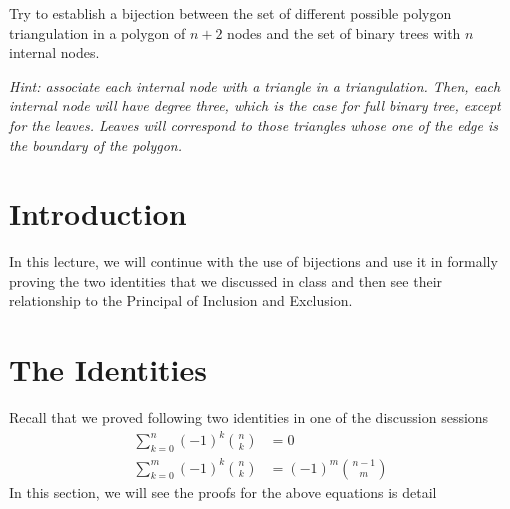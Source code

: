 
\begin{ex}
\item Try to establish a bijection between the set of different possible polygon triangulation in a polygon of $n+2$ nodes and the set of binary trees with $n$ internal nodes.

\textit{Hint: associate each internal node with a triangle in a triangulation. Then, each internal node will have degree three, which is the case for full binary tree, except for the leaves. Leaves will correspond to those triangles whose one of the edge is the boundary of the polygon.}
\end{ex}

 


\section{Introduction}
In this lecture, we will continue with the use of bijections and use it in formally proving the two identities that we discussed in class and then see their relationship to the Principal of Inclusion and Exclusion. 

\section{The Identities}
Recall that we proved following two identities in one of the discussion sessions
\begin{align}
     \sum_{k=0}^n (-1)^k{n\choose k} &= 0 \label{REV1}\\ 
     \sum_{k=0}^m (-1)^k{n\choose k} &= (-1)^m{n-1\choose m} \label{REV2}
\end{align}
In this section, we will see the proofs for the above equations is detail
